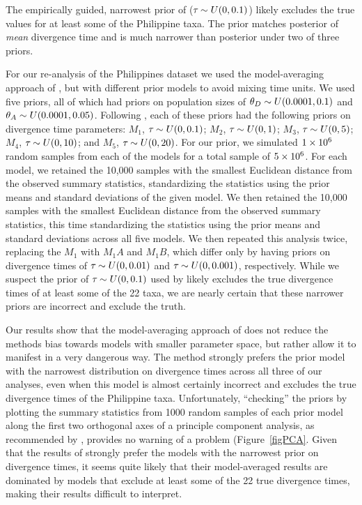 \documentclass[letterpaper,12pt]{article}
\begin{document}
\begin{linenumbers}
The empirically guided, narrowest prior of \citet{Hickerson2013} ($\tau_{} \sim
U(0,0.1)$) likely excludes the true values for at least some of the Philippine
taxa.
The prior matches posterior of \emph{mean} divergence time and is much
narrower than posterior under two of three priors.

For our re-analysis of the Philippines dataset we used the model-averaging
approach of \citet{Hickerson2013}, but with different prior models to avoid
mixing time units. We used five priors, all of which had priors on population
sizes of $\meanDescendantTheta{} \sim U(0.0001, 0.1)$ and
$\ancestralTheta{} \sim U(0.0001, 0.05)$.
Following \citet{Hickerson2013}, each of these priors had the following
priors on divergence time parameters:
$M_1$, $\tau_{} \sim U(0, 0.1)$;
$M_2$, $\tau_{} \sim U(0, 1)$;
$M_3$, $\tau_{} \sim U(0, 5)$;
$M_4$, $\tau_{} \sim U(0, 10)$; and
$M_5$, $\tau_{} \sim U(0, 20)$.
For our prior, we simulated $1\times 10^{6}$ random samples from each of the models
for a total sample of $5\times 10^{6}$.
For each model, we retained the 10,000 samples with the smallest Euclidean
distance from the observed summary statistics, standardizing the statistics
using the prior means and standard deviations of the given model.
We then retained the 10,000 samples with the smallest Euclidean distance from
the observed summary statistics, this time standardizing the statistics using
the prior means and standard deviations across all five models.
We then repeated this analysis twice, replacing the $M_1$ with
$M_1A$ and $M_1B$, which differ only by having priors on divergence
times of $\tau_{} \sim U(0, 0.01)$ and $\tau_{} \sim U(0, 0.001)$,
respectively.
While we suspect the prior of $\tau_{} \sim U(0, 0.1)$ used by
\citet{Hickerson2013} likely excludes the true divergence times of
at least some of the 22 taxa, we are nearly certain that these
narrower priors are incorrect and exclude the truth.

Our results show that the model-averaging approach of \citet{Hickerson2013}
does not reduce the methods bias towards models with smaller parameter space,
but rather allow it to manifest in a very dangerous way.
The method strongly prefers the prior model with the narrowest distribution on
divergence times across all three of our analyses, even when this model is
almost certainly incorrect and excludes the true divergence times of the
Philippine taxa.
Unfortunately, ``checking'' the priors by plotting the summary statistics from
1000 random samples of each prior model along the first two orthogonal axes of
a principle component analysis, as recommended by \citet{Hickerson2013},
provides no warning of a problem (Figure~\ref{figPCA}.
Given that the results of \citet{Hickerson2013} strongly prefer the models with
the narrowest prior on divergence times, it seems quite likely that their
model-averaged results are dominated by models that exclude at least some of
the 22 true divergence times, making their results difficult to interpret.


\end{linenumbers}
\end{document}
